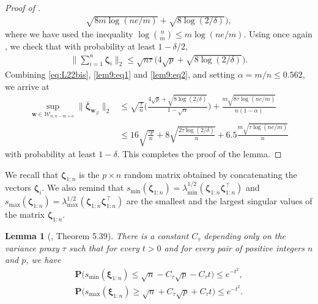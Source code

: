 \documentclass[aos,preprint,reqno]{imsart}
\newcommand\bxi{\boldsymbol\xi}
\newcommand\bzeta{\boldsymbol\zeta}
\newcommand\bfP{\mathbf P}
\newcommand\bw{\boldsymbol w}
\theoremstyle{plain}
\newtheorem{lemma}{Lemma}
\theoremstyle{remark}
\begin{document}
\begin{proof}[Proof of ]
\begin{align}
			\sqrt{8m\log(ne/m)} +\sqrt{8\log(2/\delta)}\big),
	\end{align}
	where we have used the inequality $\log {n\choose{m}}\le m 
	\log (ne/m)$. Using once again , we check that
	with probability at least $1-\delta/2$,
	\begin{align}\label{lem9:eq2}
	    \bigg\|\sum_{i=1}^n \bzeta_i\bigg\|_2 
	    \le \sqrt{n\tau}\big(4\sqrt{p} + \sqrt{8\log(2/\delta)}\big).
	\end{align}
	Combining \eqref{eq:L22bis}, \eqref{lem9:eq1} and \eqref{lem9:eq2},
	and setting $\alpha=m/n\le 0.562$, we arrive at
	\begin{align}
	    \sup_{\bw\in \mathcal W_{n,n-m+o}}
		\|\bar{\bzeta}_{\bw_{|I}}\|_2 &\le 
		\sqrt{\frac{\tau}{n}}\bigg(\frac{4\sqrt{p}+\sqrt{8\log(2/\delta)}}{1
		-\sqrt{\alpha}}\bigg) + \frac{m\sqrt{8\tau\log(ne/m)}}{n(1-\alpha)}\\
		&\le 
		16\sqrt{\frac{\tau p}{n}} + 8\sqrt{\frac{2\tau\log(2/\delta)}{n}} + 6.5\frac{m\sqrt{\tau\log(ne/m)}}{n}
	\end{align}
	with probability at least $1-\delta$. This completes the proof of the lemma.
	\end{proof}
	
	We recall that $\bzeta_{1:n}$ is the 
	$p\times n$ random matrix obtained by concatenating the vectors 
	$\bzeta_i$. We also remind that  $s_{\min}(\bzeta_{1:n}) = 
	\lambda_{\min}^{1/2}(\bzeta_{1:n}\bzeta_{1:n}^\top)$ 
	and $s_{\max}(\bzeta_{1:n}) = \lambda_{\max}^{1/2}
	(\bzeta_{1:n}\bzeta_{1:n}^\top)$ are the smallest and the 
	largest singular values of the matrix $\bzeta_{1:n}$. 

	\begin{lemma}[\cite{vershynin_2012}, Theorem 5.39]\label{lem:vershynin:bis}
	There is a constant $C_\tau$ depending only on the variance 
	proxy $\tau$ such that for every $t>0$ and for every pair of 
	positive integers $n$ and $p$, 
	we have
	\begin{align}
		\bfP\big(s_{\min}(\bxi_{1:n})  \le \sqrt{n} - C_\tau\sqrt{p} 
		- C_\tau t\big)  \le e^{-t^2},\\
		\bfP\big(s_{\max}(\bxi_{1:n})  \ge \sqrt{n} + C_\tau\sqrt{p} 
		+ C_\tau t\big)  \le e^{-t^2}.
	\end{align}
	\end{lemma}
\end{document}
